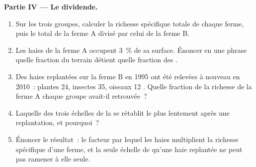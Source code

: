 \begin{problem}
\medskip
\noindent\textbf{Partie IV --- Le dividende.}
\begin{enumerate}[resume]
  \item Sur les trois groupes, calculer la richesse spécifique totale
        de chaque ferme, puis le total de la ferme A divisé par celui
        de la ferme B.
  \item Les haies de la ferme A occupent 3~\% de sa surface. Énoncer
        en une phrase quelle fraction du terrain détient quelle
        fraction des .
  \item Des haies replantées sur la ferme B en 1995 ont été relevées à
        nouveau en 2010~: plantes 24, insectes 35, oiseaux 12 .
        Quelle fraction de la richesse de la ferme A chaque groupe
        avait-il retrouvée~?
  \item Laquelle des trois échelles de la  se rétablit le
        plus lentement après une replantation, et pourquoi~?
  \item Énoncer le résultat~: le facteur par lequel les haies
        multiplient la richesse spécifique d'une ferme, et la seule
        échelle de  qu'une haie replantée ne peut pas
        ramener à elle seule.
\end{enumerate}
\end{problem}
